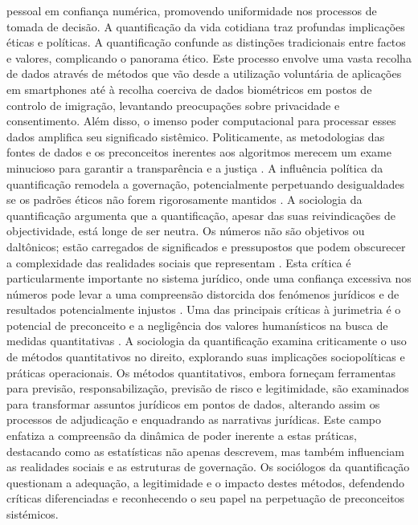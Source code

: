 \begin{agradecimentos}
pessoal em confiança numérica, promovendo uniformidade nos processos de tomada de decisão. A quantificação da vida cotidiana traz profundas implicações éticas e políticas. A quantificação confunde as distinções tradicionais entre factos e valores, complicando o panorama ético. Este processo envolve uma vasta recolha de dados através de métodos que vão desde a utilização voluntária de aplicações em smartphones até à recolha coerciva de dados biométricos em postos de controlo de imigração, levantando preocupações sobre privacidade e consentimento. Além disso, o imenso poder computacional para processar esses dados amplifica seu significado sistêmico. Politicamente, as metodologias das fontes de dados e os preconceitos inerentes aos algoritmos merecem um exame minucioso para garantir a transparência e a justiça \cite{sareen2020}. A influência política da quantificação remodela a governação, potencialmente perpetuando desigualdades se os padrões éticos não forem rigorosamente mantidos \cite{camargo2022}. A sociologia da quantificação argumenta que a quantificação, apesar das suas reivindicações de objectividade, está longe de ser neutra. Os números não são objetivos ou daltônicos; estão carregados de significados e pressupostos que podem obscurecer a complexidade das realidades sociais que representam \cite{10.5040/9781350220645,10.1590/dados.2022.65.3.267}. Esta crítica é particularmente importante no sistema jurídico, onde uma confiança excessiva nos números pode levar a uma compreensão distorcida dos fenómenos jurídicos e de resultados potencialmente injustos \cite{10.1057/s41599-020-00557-0,de2010jurimetrics}. Uma das principais críticas à jurimetria é o potencial de preconceito e a negligência dos valores humanísticos na busca de medidas quantitativas \cite{10.1177/09596801221075807,de2010jurimetrics}. A sociologia da quantificação examina criticamente o uso de métodos quantitativos no direito, explorando suas implicações sociopolíticas e práticas operacionais. Os métodos quantitativos, embora forneçam ferramentas para previsão, responsabilização, previsão de risco e legitimidade, são examinados para transformar assuntos jurídicos em pontos de dados, alterando assim os processos de adjudicação e enquadrando as narrativas jurídicas. Este campo enfatiza a compreensão da dinâmica de poder inerente a estas práticas, destacando como as estatísticas não apenas descrevem, mas também influenciam as realidades sociais e as estruturas de governação. Os sociólogos da quantificação questionam a adequação, a legitimidade e o impacto destes métodos, defendendo críticas diferenciadas e reconhecendo o seu papel na perpetuação de preconceitos sistémicos. 
    

\end{agradecimentos}
